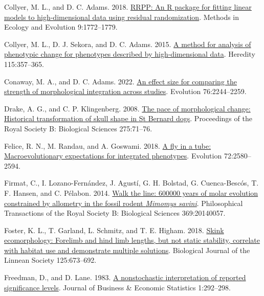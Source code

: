 \documentclass[
  11pt,
]{article}
\newlength{\cslhangindent}
\newlength{\cslentryspacingunit} %
\newenvironment{CSLReferences}[2] %
 {%
  \setlength{\parindent}{0pt}
  \ifodd #1
  \let\oldpar\par
  \def\par{\hangindent=\cslhangindent\oldpar}
  \fi
  \setlength{\parskip}{#2\cslentryspacingunit}
 }%
 {}
\begin{document}
\begin{CSLReferences}{1}{0}
\leavevmode{}%
Collyer, M. L., and D. C. Adams. 2018.
\href{https://doi.org/10.1111/2041-210X.13029}{RRPP: An {R} package for
fitting linear models to high-dimensional data using residual
randomization}. Methods in Ecology and Evolution 9:1772--1779.

\leavevmode{}%
Collyer, M. L., D. J. Sekora, and D. C. Adams. 2015.
\href{https://doi.org/10.1038/hdy.2014.75}{A method for analysis of
phenotypic change for phenotypes described by high-dimensional data}.
Heredity 115:357--365.

\leavevmode{}%
Conaway, M. A., and D. C. Adams. 2022.
\href{https://doi.org/10.1111/evo.14595}{An effect size for comparing
the strength of morphological integration across studies}. Evolution
76:2244--2259.

\leavevmode{}%
Drake, A. G., and C. P. Klingenberg. 2008.
\href{https://doi.org/10.1098/rspb.2007.1169}{The pace of morphological
change: Historical transformation of skull shape in {S}t {B}ernard
dogs}. Proceedings of the Royal Society B: Biological Sciences
275:71--76.

\leavevmode{}%
Felice, R. N., M. Randau, and A. Goswami. 2018.
\href{https://doi.org/10.1111/evo.13608}{A fly in a tube:
Macroevolutionary expectations for integrated phenotypes}. Evolution
72:2580--2594.

\leavevmode{}%
Firmat, C., I. Lozano-Fernández, J. Agustí, G. H. Bolstad, G.
Cuenca-Bescós, T. F. Hansen, and C. Pélabon. 2014.
\href{https://doi.org/10.1098/rstb.2014.0057}{Walk the line: 600000
years of molar evolution constrained by allometry in the fossil rodent
\emph{{M}imomys savini}}. Philosophical Transactions of the Royal
Society B: Biological Sciences 369:20140057.

\leavevmode{}%
Foster, K. L., T. Garland, L. Schmitz, and T. E. Higham. 2018.
\href{https://doi.org/10.1093/biolinnean/bly146}{{Skink ecomorphology:
Forelimb and hind limb lengths, but not static stability, correlate with
habitat use and demonstrate multiple solutions}}. Biological Journal of
the Linnean Society 125:673--692.

\leavevmode{}%
Freedman, D., and D. Lane. 1983.
\href{https://doi.org/10.2307/1391660}{A nonstochastic interpretation of
reported significance levels}. Journal of Business {\&} Economic
Statistics 1:292--298.


\end{CSLReferences}
\end{document}
